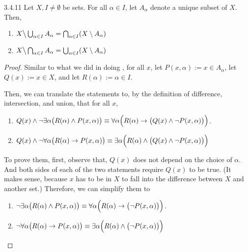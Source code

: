 \begin{exercise}{3.4.11}
	Let $X, I \ne \emptyset$ be sets. For all $\alpha \in I$, let $A_\alpha$ denote a unique subset of $X$. Then,
	\begin{enumerate}
		\item $X \big\backslash\bigcup_{\alpha \in I} A_\alpha = \bigcap_{\alpha\in I}(X \setminus A_\alpha)$
		\item $X \big\backslash\bigcap_{\alpha \in I} A_\alpha = \bigcup_{\alpha\in I}(X \setminus A_\alpha)$
	\end{enumerate}
\end{exercise}
\begin{proof}
	Similar to what we did in doing , for all $x$, let $P(x,\alpha) := x \in A_\alpha$, let $Q(x) := x \in X$, and let $R(\alpha) := \alpha \in I$.
	
	Then, we can translate the statements to, by the definition of difference, intersection, and union, that for all $x$,
	\begin{enumerate}
		\item $Q(x) \wedge \neg \exists\alpha\bigl(R(\alpha) \wedge P(x,\alpha)\bigr) \equiv \forall\alpha\Bigl(R(\alpha) \to \bigl(Q(x) \wedge \neg P(x,\alpha)\bigr)\Bigr)$.
		\item $Q(x) \wedge \neg \forall\alpha\bigl(R(\alpha) \to P(x,\alpha)\bigr) \equiv \exists\alpha\Bigl(R(\alpha) \wedge \bigl(Q(x) \wedge \neg P(x,\alpha)\bigr)\Bigr)$
	\end{enumerate}

	To prove them, first, observe that, $Q(x)$ does not depend on the choice of $\alpha$. And both sides of each of the two statements require $Q(x)$ to be true. (It makes sense, because $x$ has to be in $X$ to fall into the difference between $X$ and another set.) Therefore, we can simplify them to
	\begin{enumerate}
		\item $\neg \exists\alpha\bigl(R(\alpha) \wedge P(x,\alpha)\bigr) \equiv \forall\alpha\Bigl(R(\alpha) \to \bigl(\neg P(x,\alpha)\bigr)\Bigr)$.
		\item $\neg \forall\alpha\bigl(R(\alpha) \to P(x,\alpha)\bigr) \equiv \exists\alpha\Bigl(R(\alpha) \wedge \bigl(\neg P(x,\alpha)\bigr)\Bigr)$
	\end{enumerate}


\end{proof}
